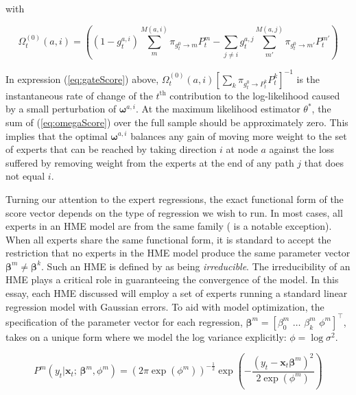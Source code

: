 \documentclass[12pt]{article}
\newcommand{\bw}[1]{\boldsymbol{\omega}^{#1}}
\newcommand{\gateprod}[2]{\pi_{#1 \longrightarrow #2}}
\newcommand{\FnOmegaNaught}[2]{\Omega^{(0)}_{t}( #1, #2 )}
\theoremstyle{definition}
\begin{document}
with

\begin{equation} \label{eq:omegaScore}
  \FnOmegaNaught{a}{i} = \left( (1 - g^{a, i}_{t}) \sum_{m}^{M(a, i)} \gateprod{g^{0}_{t}}{m} P^{m}_{t} - \sum_{j \neq i} g^{a, j}_{t} \sum_{m'}^{M(a, j)} \gateprod{g^{0}_{t}}{m'}  P^{m'}_{t} \right)
\end{equation}

In expression (\ref{eq:gateScore}) above, $ \FnOmegaNaught{a}{i} \left[ \sum_{k} \gateprod{g^{0}_{t}}{P^{k}_{t}} P^{k}_{t}\right]^{-1}$
is the instantaneous rate of change of the $t^{\mathrm{th}}$ contribution to
the log-likelihood caused by a small perturbation of $\bw{a, i}$.
At the maximum likelihood estimator $ \theta^{*}$, the sum
of (\ref{eq:omegaScore}) over the full sample should be approximately zero.
This implies that the optimal $\bw{a, i}$
balances any gain of moving more weight to the set of experts that can be
reached by taking direction $i$ at node $a$ against the loss suffered by 
removing weight from the experts at the end of any path $j$ that does not 
equal $i$.

\bigskip

Turning our attention to the expert regressions, the exact functional form
of the score vector depends on the type of regression we wish to run. In most
cases, all experts in an HME model are from the same family
(\citet{HuertaJiangTanner2003} is a notable exception). When all experts share
the same functional form, it is standard to accept the restriction that no experts
in the HME model produce the same parameter vector
$\boldsymbol{\beta}^{m} \neq \boldsymbol{\beta}^{k}$. Such an HME is defined by
\citet{JiangTanner2000} as being \textit{irreducible}. The irreducibility of an HME
plays a critical role in guaranteeing the convergence of the model.
In this essay, each HME discussed will employ a set of experts running 
a standard linear regression model with Gaussian errors. To aid with model optimization,
the specification of the parameter vector for each regression,
 $\boldsymbol{\beta}^{m} = [\beta_{0}^{m} \,\, \ldots \,\, \beta_{k}^m \,\, \phi^{m}]^{\top}$,
takes on a unique form where we model the log variance explicitly:
$\phi = \log \sigma^{2}$.

\begin{equation}
  P^{m}(y_{t} | \boldsymbol{x}_{t}; \, \boldsymbol{\beta}^{m}, \phi^{m}) = \left( 2 \pi \exp ( \phi^{m} ) \right)^{-\frac{1}{2}} \exp{ \left( -\frac{  ( y_{t} - \boldsymbol{x}_{t} \boldsymbol{\beta}^{m} )^{2}  }{2 \exp (\phi^{m}) } \right) }
\end{equation}
\end{document}
